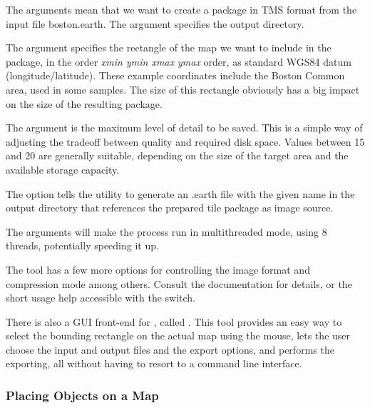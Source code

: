 
The  arguments mean that we want to create a package
in TMS format from the input file boston.earth. The 
argument specifies the output directory.

The  argument specifies the rectangle of the map we want to include
in the package, in the order \textit{xmin ymin xmax ymax} order, as standard WGS84
datum (longitude/latitude). These example coordinates include the Boston Common
area, used in some samples. The size of this rectangle obviously has a big impact
on the size of the resulting package.

The  argument is the maximum level of detail to be saved. This
is a simple way of adjusting the tradeoff between quality and required disk space.
Values between 15 and 20 are generally suitable, depending on the size of the
target area and the available storage capacity.

The  option tells the utility to generate
an .earth file with the given name in the output directory that references the
prepared tile package as image source.

The  arguments will make the process run in multithreaded
mode, using 8 threads, potentially speeding it up.

The tool has a few more options for controlling the image format and compression
mode among others. Consult the documentation for details, or the short usage help
accessible with the \ttt{-h} switch.

\begin{hint}
There is also a GUI front-end for , called
. This tool provides an easy way to select
the bounding rectangle on the actual map using the mouse, lets the user
choose the input and output files and the export options, and performs the
exporting, all without having to resort to a command line interface.
\end{hint}


\subsubsection{Placing Objects on a Map}
\label{sec:graphics:osgearth-placing-objects}

